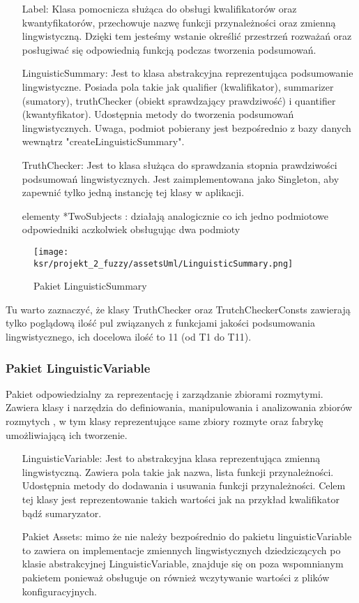 \documentclass{article}
\begin{document}
\begin{itemize}
    \item[Label:] Klasa pomocnicza służąca do obsługi kwalifikatorów oraz kwantyfikatorów, przechowuje nazwę funkcji przynależności oraz zmienną lingwistyczną. Dzięki tem jesteśmy wstanie określić przestrzeń rozważań oraz posługiwać się odpowiednią funkcją podczas tworzenia podsumowań.
    \item[LinguisticSummary:]  Jest to klasa abstrakcyjna reprezentująca podsumowanie lingwistyczne. Posiada pola takie jak qualifier (kwalifikator), summarizer (sumatory), truthChecker (obiekt sprawdzający prawdziwość) i quantifier (kwantyfikator). Udostępnia metody do tworzenia podsumowań lingwistycznych. Uwaga, podmiot pobierany jest bezpośrednio z bazy danych wewnątrz "createLinguisticSummary".
    \item[TruthChecker:] Jest to klasa służąca do sprawdzania stopnia prawdziwości podsumowań lingwistycznych. Jest zaimplementowana jako Singleton, aby zapewnić tylko jedną instancję tej klasy w aplikacji.
\item[elementy *TwoSubjects]: działają analogicznie co ich jedno podmiotowe odpowiedniki aczkolwiek obsługując dwa podmioty
\end{itemize}

\begin{figure}[H]
\centering
\texttt{[image: ksr/projekt\_2\_fuzzy/assetsUml/LinguisticSummary.png]}
\caption{Pakiet LinguisticSummary}
\label{fig:epsilon_bat}
\end{figure}

\noindent Tu warto zaznaczyć, że klasy TruthChecker oraz TrutchCheckerConsts zawierają tylko poglądową ilość pul związanych z funkcjami jakości podsumowania lingwistycznego, ich docelowa ilość to 11 (od T1 do T11).

\subsubsection{Pakiet LinguisticVariable}

\noindent Pakiet odpowiedzialny za reprezentację i zarządzanie zbiorami rozmytymi. Zawiera klasy i narzędzia do definiowania, manipulowania i analizowania zbiorów rozmytych \cite{niewiadomski19}, w tym klasy reprezentujące same zbiory rozmyte oraz fabrykę umożliwiającą ich tworzenie.

\begin{itemize}
    \item[LinguisticVariable:] Jest to abstrakcyjna klasa reprezentująca zmienną lingwistyczną. Zawiera pola takie jak nazwa, lista funkcji przynależności. Udostępnia metody do dodawania i usuwania funkcji przynależności. Celem tej klasy jest reprezentowanie takich wartości jak na przykład kwalifikator bądź sumaryzator.
    \item[Pakiet Assets:] mimo że nie należy bezpośrednio do pakietu linguisticVariable to zawiera on implementacje zmiennych lingwistycznych dziedziczących po klasie abstrakcyjnej LinguisticVariable, znajduje się on poza wspomnianym pakietem ponieważ obsługuje on również wczytywanie wartości z plików konfiguracyjnych.
\end{itemize}
\end{document}
